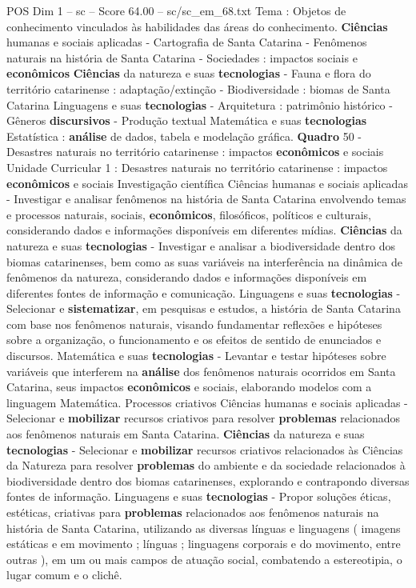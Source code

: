 \begin{textsample}{POS Dim 1 – sc – Score 64.00 – sc/sc\_em\_68.txt}
Tema : Objetos de conhecimento vinculados às habilidades das áreas do conhecimento. \textbf{Ciências} humanas e sociais aplicadas - Cartografia de Santa Catarina - Fenômenos naturais na história de Santa Catarina - Sociedades : impactos sociais e \textbf{econômicos} \textbf{Ciências} da natureza e suas \textbf{tecnologias} - Fauna e flora do território catarinense : adaptação/extinção - Biodiversidade : biomas de Santa Catarina Linguagens e suas \textbf{tecnologias} - Arquitetura : patrimônio histórico - Gêneros \textbf{discursivos} - Produção textual Matemática e suas \textbf{tecnologias} Estatística : \textbf{análise} de dados, tabela e modelação gráfica. \textbf{Quadro} 50 - Desastres naturais no território catarinense : impactos \textbf{econômicos} e sociais Unidade Curricular 1 : Desastres naturais no território catarinense : impactos \textbf{econômicos} e sociais Investigação científica Ciências humanas e sociais aplicadas - Investigar e analisar fenômenos na história de Santa Catarina envolvendo temas e processos naturais, sociais, \textbf{econômicos}, filosóficos, políticos e culturais, considerando dados e informações disponíveis em diferentes mídias. \textbf{Ciências} da natureza e suas \textbf{tecnologias} - Investigar e analisar a biodiversidade dentro dos biomas catarinenses, bem como as suas variáveis na interferência na dinâmica de fenômenos da natureza, considerando dados e informações disponíveis em diferentes fontes de informação e comunicação.
Linguagens e suas \textbf{tecnologias} - Selecionar e \textbf{sistematizar}, em pesquisas e estudos, a história de Santa Catarina com base nos fenômenos naturais, visando fundamentar reflexões e hipóteses sobre a organização, o funcionamento e os efeitos de sentido de enunciados e discursos.
Matemática e suas \textbf{tecnologias} - Levantar e testar hipóteses sobre variáveis que interferem na \textbf{análise} dos fenômenos naturais ocorridos em Santa Catarina, seus impactos \textbf{econômicos} e sociais, elaborando modelos com a linguagem Matemática.
Processos criativos Ciências humanas e sociais aplicadas - Selecionar e \textbf{mobilizar} recursos criativos para resolver \textbf{problemas} relacionados aos fenômenos naturais em Santa Catarina. \textbf{Ciências} da natureza e suas \textbf{tecnologias} - Selecionar e \textbf{mobilizar} recursos criativos relacionados às Ciências da Natureza para resolver \textbf{problemas} do ambiente e da sociedade relacionados à biodiversidade dentro dos biomas catarinenses, explorando e contrapondo diversas fontes de informação.
Linguagens e suas \textbf{tecnologias} - Propor soluções éticas, estéticas, criativas para \textbf{problemas} relacionados aos fenômenos naturais na história de Santa Catarina, utilizando as diversas línguas e linguagens ( imagens estáticas e em movimento ; línguas ; linguagens corporais e do movimento, entre outras ), em um ou mais campos de atuação social, combatendo a estereotipia, o lugar comum e o clichê.

\end{textsample}
